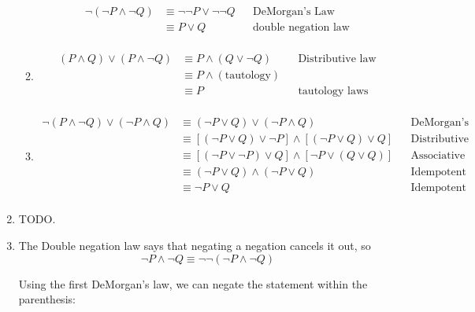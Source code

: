 \documentclass{article}
\begin{document}
\begin{enumerate}
\begin{enumerate}
    \begin{equation*}
      \begin{aligned}
	\lnot (\lnot P \land \lnot Q) & \equiv \lnot \lnot P \lor \lnot \lnot Q && \text{DeMorgan's Law} \\
	& \equiv P \lor Q && \text{double negation law} \\
	\end{aligned}
    \end{equation*}

  \item
    \begin{equation*}
      \begin{aligned}
	(P \land Q) \lor (P \land \lnot Q) & \equiv P \land (Q \lor \lnot Q) && \text{Distributive law} \\
	& \equiv P \land (\text{tautology}) \\
	& \equiv P && \text{tautology laws} \\
	\end{aligned}
    \end{equation*}

  \item
    \begin{equation*}
      \begin{aligned}
	\lnot (P \land \lnot Q) \lor (\lnot P \land Q) & \equiv (\lnot P \lor Q) \lor (\lnot P \land Q) && \text{DeMorgan's law} \\
	& \equiv [(\lnot P \lor Q) \lor \lnot P] \land [(\lnot P \lor Q) \lor Q] && \text{Distributive law} \\
	& \equiv [(\lnot P \lor \lnot P) \lor Q] \land [\lnot P \lor (Q \lor Q)] && \text{Associative law and Commutative law} \\
	& \equiv (\lnot P \lor Q) \land (\lnot P \lor Q) && \text{Idempotent laws} \\
	& \equiv \lnot P \lor Q && \text{Idempotent laws} \\
	\end{aligned}
    \end{equation*}
  \end{enumerate}
\item
  TODO.
\item
  The Double negation law says that negating a negation cancels it out, so
  \begin{equation*}
    \lnot P \land \lnot Q \equiv \lnot \lnot (\lnot P \land \lnot Q)
  \end{equation*}

  Using the first DeMorgan's law, we can negate the statement within the parenthesis:


\end{enumerate}
\end{document}
